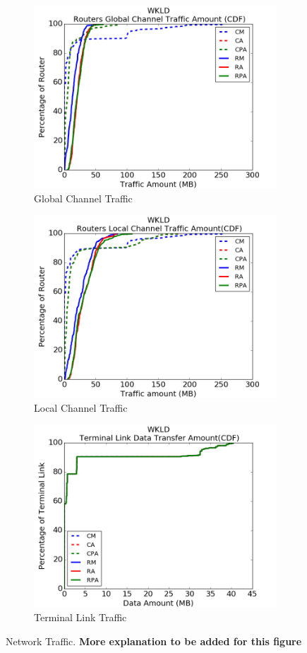 \documentclass[conference,compsoc]{IEEEtran}
\begin{document}
\begin{figure}[t!]
    \centering
    \begin{subfigure}[t]{0.32\textwidth}
        \centering
        \includegraphics[height=1.8 in]{wkld/gc-traffic}
        \caption{Global Channel Traffic}
        \label{fig:global-channel-traffic}
    \end{subfigure}%
    \hspace{1em}%
    \begin{subfigure}[t]{0.32\textwidth}
        \centering
        \includegraphics[height=1.8 in]{wkld/lc-traffic}
        \caption{Local Channel Traffic}
        \label{fig:local-channel-traffic}
    \end{subfigure}%
    \hspace{1em}%
    \begin{subfigure}[t]{0.32\textwidth}
        \centering
        \includegraphics[height=1.8 in]{wkld/tl-traffic}
        \caption{Terminal Link Traffic}
        \label{fig:terminal-link-traffic}
    \end{subfigure}%
  \caption{Network Traffic. \textbf{More explanation to be added for this figure}}
   \label{fig:wkld-network-traffic}
\end{figure}
\end{document}
